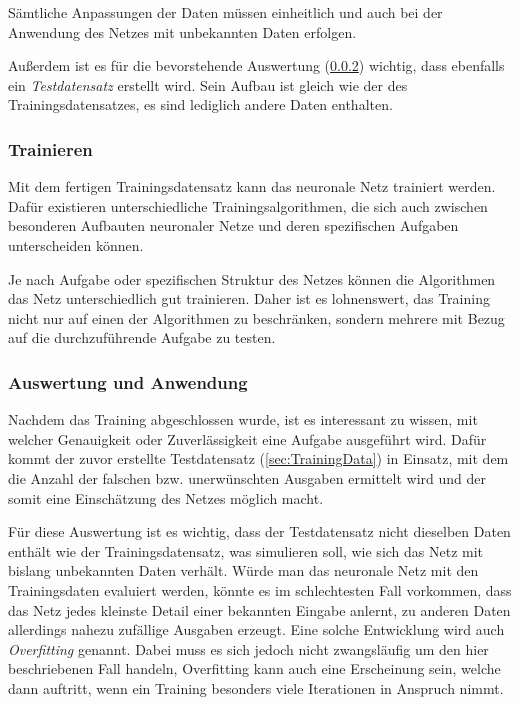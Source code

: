 \documentclass[12pt,a4]{article}
\begin{document}
Sämtliche Anpassungen der Daten müssen einheitlich und auch bei der Anwendung des Netzes mit unbekannten Daten erfolgen.

Außerdem ist es für die bevorstehende Auswertung (\ref{sec:Evaluation}) wichtig, dass ebenfalls ein \textit{Testdatensatz} erstellt wird. Sein Aufbau ist gleich wie der des Trainingsdatensatzes, es sind lediglich andere Daten enthalten. 

\subsubsection{Trainieren}\label{sec:Training}
Mit dem fertigen Trainingsdatensatz kann das neuronale Netz trainiert werden. Dafür existieren unterschiedliche Trainingsalgorithmen, die sich auch zwischen besonderen Aufbauten neuronaler Netze und deren spezifischen Aufgaben unterscheiden können. 

Je nach Aufgabe oder spezifischen Struktur des Netzes können die Algorithmen das Netz unterschiedlich gut trainieren. Daher ist es lohnenswert, das Training nicht nur auf einen der Algorithmen zu beschränken, sondern mehrere mit Bezug auf die durchzuführende Aufgabe zu testen.

\subsubsection{Auswertung und Anwendung}\label{sec:Evaluation}
Nachdem das Training abgeschlossen wurde, ist es interessant zu wissen, mit welcher Genauigkeit oder Zuverlässigkeit eine Aufgabe ausgeführt wird. Dafür kommt der zuvor erstellte Testdatensatz (\ref{sec:TrainingData}) in Einsatz, mit dem die Anzahl der falschen bzw. unerwünschten Ausgaben ermittelt wird und der somit eine Einschätzung des Netzes möglich macht.

Für diese Auswertung ist es wichtig, dass der Testdatensatz nicht dieselben Daten enthält wie der Trainingsdatensatz, was simulieren soll, wie sich das Netz mit bislang unbekannten Daten verhält. Würde man das neuronale Netz mit den Trainingsdaten evaluiert werden, könnte es im schlechtesten Fall vorkommen, dass das Netz jedes kleinste Detail einer bekannten Eingabe anlernt, zu anderen Daten allerdings nahezu zufällige Ausgaben erzeugt. Eine solche Entwicklung wird auch \textit{Overfitting} genannt. Dabei muss es sich jedoch nicht zwangsläufig um den hier beschriebenen Fall handeln, Overfitting kann auch eine Erscheinung sein, welche dann auftritt, wenn ein Training besonders viele Iterationen in Anspruch nimmt.
\end{document}

